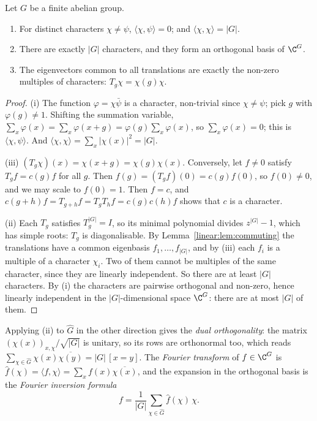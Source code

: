\begin{theorem}\label{linear:thm:characters}
Let $G$ be a finite abelian group.
\begin{enumerate}[label=(\roman*)]
\item For distinct characters $\chi\ne\psi$, $\langle\chi,\psi\rangle=0$; and $\langle\chi,\chi\rangle=|G|$.
\item There are exactly $|G|$ characters, and they form an orthogonal basis of $\C^G$.
\item The eigenvectors common to all translations are exactly the non-zero multiples of characters: $T_g\chi=\chi(g)\chi$.
\end{enumerate}
\end{theorem}
\begin{proof}
(i) The function $\varphi=\chi\bar\psi$ is a character, non-trivial since $\chi\ne\psi$; pick $g$ with $\varphi(g)\ne1$. Shifting
the summation variable, $\sum_x\varphi(x)=\sum_x\varphi(x+g)=\varphi(g)\sum_x\varphi(x)$, so $\sum_x\varphi(x)=0$; this is
$\langle\chi,\psi\rangle$. And $\langle\chi,\chi\rangle=\sum_x|\chi(x)|^2=|G|$.

(iii) $(T_g\chi)(x)=\chi(x+g)=\chi(g)\chi(x)$. Conversely, let $f\ne0$ satisfy $T_gf=c(g)f$ for all $g$. Then $f(g)=(T_gf)(0)=
c(g)f(0)$, so $f(0)\ne0$, and we may scale to $f(0)=1$. Then $f=c$, and $c(g+h)f=T_{g+h}f=T_gT_hf=c(g)c(h)f$ shows that $c$ is a
character.

(ii) Each $T_g$ satisfies $T_g^{|G|}=I$, so its minimal polynomial divides $z^{|G|}-1$, which has simple roots: $T_g$ is
diagonalisable. By Lemma~\ref{linear:lem:commuting} the translations have a common eigenbasis $f_1,\dots,f_{|G|}$, and by (iii) each
$f_i$ is a multiple of a character $\chi_i$. Two of them cannot be multiples of the same character, since they are linearly
independent. So there are at least $|G|$ characters. By (i) the characters are pairwise orthogonal and non-zero, hence linearly
independent in the $|G|$-dimensional space $\C^G$: there are at most $|G|$ of them.
\end{proof}

Applying (ii) to $\widehat G$ in the other direction gives the \emph{dual orthogonality}: the matrix $(\chi(x))_{x,\chi}/\sqrt{|G|}$ is
unitary, so its rows are orthonormal too, which reads $\sum_{\chi\in\widehat G}\chi(x)\overline{\chi(y)}=|G|\,[x=y]$. The
\emph{Fourier transform} of $f\in\C^G$ is $\hat f(\chi)=\langle f,\chi\rangle=\sum_xf(x)\overline{\chi(x)}$, and the expansion in the
orthogonal basis is the \emph{Fourier inversion formula}
\[
f=\frac1{|G|}\sum_{\chi\in\widehat G}\hat f(\chi)\,\chi.
\]

